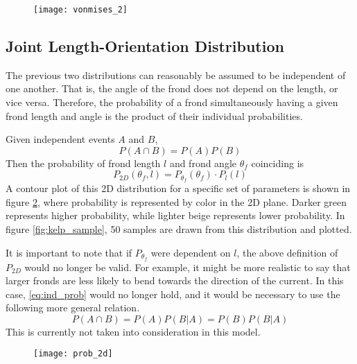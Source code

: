 \begin{figure}[h]
	\centering
	\texttt{[image: vonmises\_2]}
	\label{fig:vonmises}
\end{figure}

\subsection{Joint Length-Orientation Distribution}
\label{sec:2d_dist}
The previous two distributions can reasonably be assumed to be independent of one another. That is, the angle of the frond does not depend on the length, or vice versa.
Therefore, the probability of a frond simultaneously having a given frond length and angle is the product of their individual probabilities.

Given independent events $A$ and $B$,
\begin{equation}
	\label{eq:ind_prob}
	P(A \cap B) = P(A)P(B)
\end{equation}
Then the probability of frond length $l$ and frond angle $\theta_f$ coinciding is 
\begin{equation}
	P_{2D}(\theta_f,l) = P_{\theta_f}(\theta_f) \cdot P_l(l)
\end{equation}
A contour plot of this 2D distribution for a specific set of parameters is shown in figure \ref{fig:dist_2d}, where probability is represented by color in the 2D plane.
Darker green represents higher probability, while lighter beige represents lower probability.
In figure \ref{fig:kelp_sample}, 50 samples are drawn from this distribution and plotted.

It is important to note that if $P_{\theta_f}$ were dependent on $l$, the above definition of $P_{2D}$ would no longer be valid.
For example, it might be more realistic to say that larger fronds are less likely to bend towards the direction of the current.
In this case, \eqref{eq:ind_prob} would no longer hold, and it would be necessary to use the following more general relation.
\begin{equation}
	P(A \cap B) = P(A)P(B|A) = P(B)P(B|A)
\end{equation}
This is currently not taken into consideration in this model.

\begin{figure}[h]
	\centering
	\texttt{[image: prob\_2d]}
	\vspace{-3em}
	\label{fig:dist_2d}
\end{figure}

